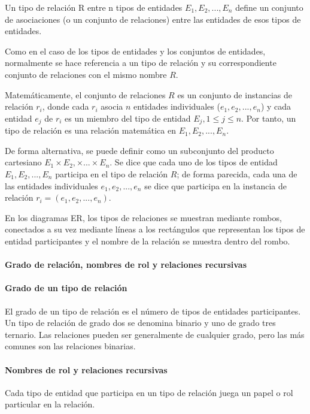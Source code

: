 Un tipo de relación R entre n tipos de entidades $E_1, E_2, ..., E_n$ define un conjunto de asociaciones (o un conjunto de relaciones) entre las entidades de esos tipos de entidades. 


Como en el caso de los tipos de entidades y los conjuntos de entidades, normalmente se hace referencia a un tipo de relación y su correspondiente conjunto de relaciones con el mismo nombre $R$.


Matemáticamente, el conjunto de relaciones $R$ es un conjunto de instancias de relación $r_i$, donde cada $r_i$ asocia $n$ entidades individuales ($e_1, e_2,..., e_n$) y cada entidad $e_j$ de $r_i$ es un miembro del tipo de entidad $E_j, 1 \leq j \leq n$. Por tanto, un tipo de relación es una relación matemática en $E_1, E_2,..., E_n$.


De forma alternativa, se puede definir como un subconjunto del producto cartesiano $E_1 \times E_2,\times ... 	\times E_n$. Se dice que cada uno de los tipos de entidad $E_1, E_2,..., E_n$ participa en el tipo de relación $R$; de forma parecida, cada una de las entidades individuales $e_1, e_2,..., e_n$ se dice que participa en la instancia de relación $r_i = (e_1, e_2,..., e_n)$.


En los diagramas ER, los tipos de relaciones se muestran mediante rombos, conectados a su vez mediante líneas a los rectángulos que representan los tipos de entidad participantes y el nombre de la relación se muestra dentro del rombo.


\paragraph*{Grado de relación, nombres de rol y relaciones recursivas}
\paragraph*{Grado de un tipo de relación}
El grado de un tipo de relación es el número de tipos de entidades participantes. Un tipo de relación de grado dos se denomina binario y uno de grado tres ternario. Las relaciones pueden ser generalmente de cualquier grado, pero las más comunes son las relaciones binarias.

\paragraph*{Nombres de rol y relaciones recursivas}
Cada tipo de entidad que participa en un tipo de relación juega un papel o rol particular en la relación.


